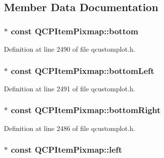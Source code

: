 \subsection{Member Data Documentation}
\hypertarget{class_q_c_p_item_pixmap_ad7da77f530868e846151eff8a28fb948}{
\subsubsection[{bottom}]{$\ast$ const Q\-C\-P\-Item\-Pixmap\-::bottom}}\label{class_q_c_p_item_pixmap_ad7da77f530868e846151eff8a28fb948}


Definition at line 2490 of file qcustomplot.\-h.

\hypertarget{class_q_c_p_item_pixmap_a01943e569233382b3627e24636b0fff2}{
\subsubsection[{bottom\-Left}]{$\ast$ const Q\-C\-P\-Item\-Pixmap\-::bottom\-Left}}\label{class_q_c_p_item_pixmap_a01943e569233382b3627e24636b0fff2}


Definition at line 2491 of file qcustomplot.\-h.

\hypertarget{class_q_c_p_item_pixmap_abcc38063f9502b876bf6615c45cc0994}{
\subsubsection[{bottom\-Right}]{$\ast$ const Q\-C\-P\-Item\-Pixmap\-::bottom\-Right}}\label{class_q_c_p_item_pixmap_abcc38063f9502b876bf6615c45cc0994}


Definition at line 2486 of file qcustomplot.\-h.

\hypertarget{class_q_c_p_item_pixmap_a8c85fcb8cb8ce292859a0499d16539b1}{
\subsubsection[{left}]{$\ast$ const Q\-C\-P\-Item\-Pixmap\-::left}}\label{class_q_c_p_item_pixmap_a8c85fcb8cb8ce292859a0499d16539b1}


